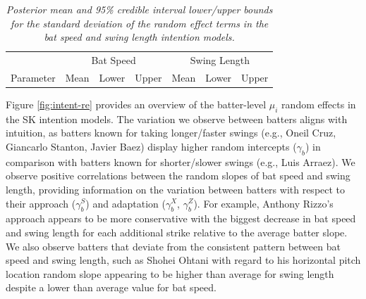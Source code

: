 \documentclass{article}
\begin{document}
      \begin{table}[H]
        \centering
        \begin{tabular}{l|rrr|rrr|}
                  & \multicolumn{3}{c|}{Bat Speed}          & \multicolumn{3}{c|}{Swing Length}  \\
        Parameter & Mean  & Lower  & Upper & Mean  & Lower  & Upper \\
          \hline
          
        \end{tabular}
        \caption{\it Posterior mean and 95\% credible interval lower/upper bounds for the standard deviation of the random effect terms in the bat speed and swing length intention models.}
        \label{tab:intention-variances}
      \end{table}

      Figure \ref{fig:intent-re} provides an overview of the batter-level $\mu_i$ random effects in the SK intention models. The variation we observe between batters aligns with intuition, as batters known for taking longer/faster swings (e.g., Oneil Cruz, Giancarlo Stanton, Javier Baez) display higher random intercepts ($\gamma_b$) in comparison with batters known for shorter/slower swings (e.g., Luis Arraez). We observe positive correlations between the random slopes of bat speed and swing length, providing information on the variation between batters with respect to their approach ($\gamma_b^S$) and adaptation ($\gamma_b^X$, $\gamma_b^Z$). For example, Anthony Rizzo's approach appears to be more conservative with the biggest decrease in bat speed and swing length for each additional strike relative to the average batter slope. We also observe batters that deviate from the consistent pattern between bat speed and swing length, such as Shohei Ohtani with regard to his horizontal pitch location random slope appearing to be higher than average for swing length despite a lower than average value for bat speed. 
      
\end{document}
